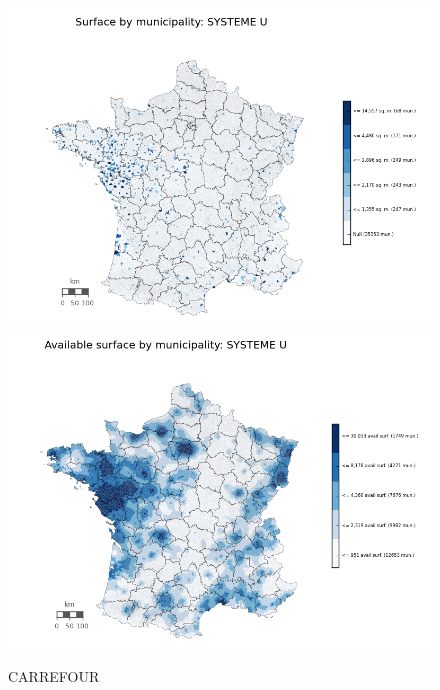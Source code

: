 \documentclass[11pt]{article}
\begin{document}
\begin{figure}[H]
    \caption{CARREFOUR}
	\centering
		\includegraphics[width=15cm]{images/maps_surface/SYSTEMEU.png}
        \includegraphics[width=15cm]{images/maps_available_surface/SYSTEMEU.png}
\end{figure}
\end{document}
